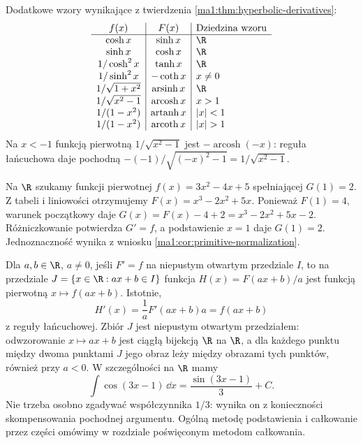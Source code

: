 Dodatkowe wzory wynikające z twierdzenia \ref{ma1:thm:hyperbolic-derivatives}:
\[
\begin{array}{c|c|l}
 f(x)&F(x)&\text{Dziedzina wzoru}\\ \hline
 \cosh x & \sinh x & \R\\
 \sinh x & \cosh x & \R\\
 1/\cosh^2x & \tanh x & \R\\
 1/\sinh^2x & -\coth x & x\ne0\\
 1/\sqrt{1+x^2} & \operatorname{arsinh}x & \R\\
 1/\sqrt{x^2-1} & \operatorname{arcosh}x & x>1\\
 1/(1-x^2) & \operatorname{artanh}x & |x|<1\\
 1/(1-x^2) & \operatorname{arcoth}x & |x|>1
\end{array}
\]
Na $x<-1$ funkcją pierwotną $1/\sqrt{x^2-1}$ jest $-\operatorname{arcosh}(-x)$: reguła łańcuchowa daje pochodną $-(-1)/\sqrt{(-x)^2-1}=1/\sqrt{x^2-1}$.

\begin{przyklad}
\label{ma1:ex:primitive-polynomial}
Na $\R$ szukamy funkcji pierwotnej $f(x)=3x^2-4x+5$ spełniającej $G(1)=2$. Z tabeli i liniowości otrzymujemy $F(x)=x^3-2x^2+5x$. Ponieważ $F(1)=4$, warunek początkowy daje $G(x)=F(x)-4+2=x^3-2x^2+5x-2$. Różniczkowanie potwierdza $G'=f$, a podstawienie $x=1$ daje $G(1)=2$. Jednoznaczność wynika z wniosku \ref{ma1:cor:primitive-normalization}.
\end{przyklad}

\begin{przyklad}
\label{ma1:ex:primitive-affine-argument}
Dla $a,b\in\R$, $a\ne0$, jeśli $F'=f$ na niepustym otwartym przedziale $I$, to na przedziale $J=\{x\in\R:ax+b\in I\}$ funkcja $H(x)=F(ax+b)/a$ jest funkcją pierwotną $x\mapsto f(ax+b)$. Istotnie,
\[
 H'(x)=\frac1a F'(ax+b)a=f(ax+b)
\]
z reguły łańcuchowej. Zbiór $J$ jest niepustym otwartym przedziałem: odwzorowanie $x\mapsto ax+b$ jest ciągłą bijekcją $\R$ na $\R$, a dla każdego punktu między dwoma punktami $J$ jego obraz leży między obrazami tych punktów, również przy $a<0$. W szczególności na $\R$ mamy
\[
 \int \cos(3x-1)\,\dd x=\frac{\sin(3x-1)}3+C.
\]
Nie trzeba osobno zgadywać współczynnika $1/3$: wynika on z konieczności skompensowania pochodnej argumentu. Ogólną metodę podstawienia i całkowanie przez części omówimy w rozdziale poświęconym metodom całkowania.
\end{przyklad}

